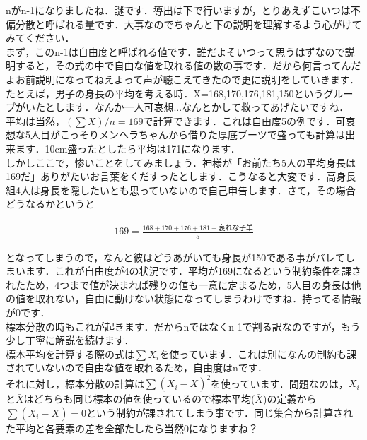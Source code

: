 \documentclass[11pt,a4paper]{ujreport} 	%
\begin{document}
nがn-1になりましたね．謎です．導出は下で行いますが，とりあえずこいつは不偏分散と呼ばれる量です．大事なのでちゃんと下の説明を理解するよう心がけてみてください．\\

まず，このn-1は自由度と呼ばれる値です．誰だよそいつって思うはずなので説明すると，その式の中で自由な値を取れる値の数の事です．だから何言ってんだよお前説明になってねえよって声が聴こえてきたので更に説明をしていきます．\\

たとえば，男子の身長の平均を考える時．X={168,170,176,181,150}というグループがいたとします．なんか一人可哀想...なんとかして救ってあげたいですね．\\

平均は当然，$(\sum X) /n= 169$で計算できます．これは自由度5の例です．可哀想な5人目がこっそりメンヘラちゃんから借りた厚底ブーツで盛っても計算は出来ます．10cm盛ったとしたら平均は171になります．\\

しかしここで，惨いことをしてみましょう．神様が「お前たち5人の平均身長は169だ」ありがたいお言葉をくだすったとします．こうなると大変です．高身長組4人は身長を隠したいとも思っていないので自己申告します．さて，その場合どうなるかというと

\begin{align}
  169 = \frac{168+170+176+181+\text{哀れな子羊}}{5}
\end{align}

となってしまうので，なんと彼はどうあがいても身長が150である事がバレてしまいます．これが自由度が4の状況です．平均が169になるという制約条件を課されたため，4つまで値が決まれば残りの値も一意に定まるため，5人目の身長は他の値を取れない，自由に動けない状態になってしまうわけですね．持ってる情報が0です．\\

標本分散の時もこれが起きます．だからnではなくn-1で割る訳なのですが，もう少し丁寧に解説を続けます．\\

標本平均を計算する際の式は$\sum X_i$を使っています．これは別になんの制約も課されていないので自由な値を取れるため，自由度はnです．\\

それに対し，標本分散の計算は$\sum (X_i -\bar{X})^2$を使っています．問題なのは，$X_i$と$\bar{X}$はどちらも同じ標本の値を使っているので標本平均($\bar{X}$)の定義から$\sum (X_i - \bar{X}) = 0$という制約が課されてしまう事です．同じ集合から計算された平均と各要素の差を全部たしたら当然0になりますね？\\
\end{document}
